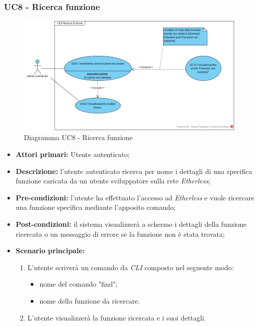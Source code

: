 \subsubsection{UC8 - Ricerca funzione}
\begin{figure}[h]
	\centering
	\includegraphics[width=\linewidth]{res/img/UC8.jpg}
	\caption{Diagramma UC8 - Ricerca funzione}
\end{figure}
\begin{itemize}
	\item \textbf{Attori primari:} Utente autenticato;
	\item \textbf{Descrizione:} l'utente autenticato ricerca per nome i dettagli di una specifica funzione caricata da un utente sviluppatore sulla rete \textit{Etherless};
	\item \textbf{Pre-condizioni:} l'utente ha effettuato l'accesso ad \textit{Etherless} e vuole ricercare una funzione specifica mediante l'apposito comando;
	\item \textbf{Post-condizioni:} il sistema visualizzerà a schermo i dettagli della funzione ricercata o un messaggio di errore se la funzione non è stata trovata;
	\item \textbf{Scenario principale:}
	\begin{enumerate}
		\item L'utente scriverà un comando da \textit{CLI\glos} composto nel seguente modo:
		\begin{itemize}
			\item nome del comando "find";
			\item nome della funzione da ricercare.
		\end{itemize}
        \item L'utente visualizzerà la funzione ricercata e i suoi dettagli.
	\end{enumerate}
\end{itemize}

